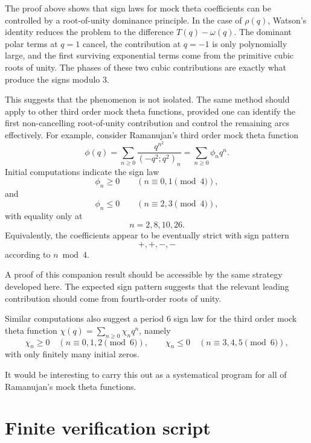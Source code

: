 \documentclass[10pt,a4paper]{amsart}
\begin{document}
The proof above shows that sign laws for mock theta coefficients can be controlled by a root-of-unity dominance principle.  In the case of \(\rho(q)\), Watson's identity reduces the problem to the difference \(T(q)-\omega(q)\).  The dominant polar terms at \(q=1\) cancel, the contribution at \(q=-1\) is only polynomially large, and the first surviving exponential terms come from the primitive cubic roots of unity.  The phases of these two cubic contributions are exactly what produce the signs modulo \(3\).

This suggests that the phenomenon is not isolated.  The same method should apply to other third order mock theta functions, provided one can identify the first non-cancelling root-of-unity contribution and control the remaining arcs effectively.  For example, consider Ramanujan's third order mock theta function
\[
\phi(q)=\sum_{n\geq0}\frac{q^{n^2}}{(-q^2;q^2)_n}
=
\sum_{n\geq0}\phi_n q^n.
\]
Initial computations indicate the sign law
\[
\phi_n\geq0\qquad(n\equiv0,1\pmod4),
\]
and
\[
\phi_n\leq0\qquad(n\equiv2,3\pmod4),
\]
with equality only at
\[
n=2,8,10,26.
\]
Equivalently, the coefficients appear to be eventually strict with sign pattern
\[
+,+,-,-
\]
according to \(n\bmod4\).

\noindent A proof of this companion result should be accessible by the same strategy developed here. 
The expected sign pattern suggests that the relevant leading contribution should come from fourth-order roots of unity. 

Similar computations also suggest a period \(6\) sign law for the third order mock theta function \(\chi(q)=\sum_{n\geq0}\chi_n q^n\), namely
\[
\chi_n\geq0\quad(n\equiv0,1,2\pmod6),\qquad
\chi_n\leq0\quad(n\equiv3,4,5\pmod6),
\]
with only finitely many initial zeros.



\noindent It would be interesting to carry this out as a systematical program for all of Ramanujan's mock theta functions. 

\appendix


\section{Finite verification script}\label{app:verification-code}
\end{document}
